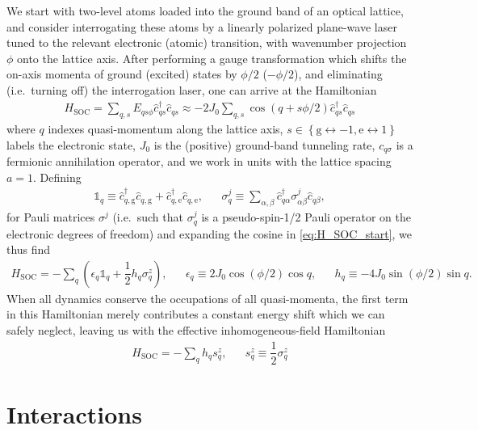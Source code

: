 \documentclass[aps,notitlepage,nofootinbib,11pt]{revtex4-1}
\renewcommand{\t}{\text} %
\newcommand{\f}[2]{\dfrac{#1}{#2}} %
\newcommand{\p}[1]{\left(#1\right)} %
\renewcommand{\set}[1]{\left\{#1\right\}} %
\newcommand{\g}{\text{g}} %
\newcommand{\e}{\text{e}}
\newcommand{\1}{\mathds{1}}
\begin{document}
We start with two-level atoms loaded into the ground band of an
optical lattice, and consider interrogating these atoms by a linearly
polarized plane-wave laser tuned to the relevant electronic (atomic)
transition, with wavenumber projection $\phi$ onto the lattice axis.
After performing a gauge transformation which shifts the on-axis
momenta of ground (excited) states by $\phi/2$ ($-\phi/2$), and
eliminating (i.e.~turning off) the interrogation laser, one can arrive
at the Hamiltonian
\begin{align}
  H_{\t{SOC}}
  = \sum_{q,s} E_{qs\phi} \hat c_{qs}^\dag \hat c_{qs}
  \approx -2 J_0\sum_{q,s} \cos\p{q+s\phi/2}
  \hat c_{qs}^\dag \hat c_{qs}
  \label{eq:H_SOC_start}
\end{align}
where $q$ indexes quasi-momentum along the lattice axis,
$s\in\set{\g\leftrightarrow-1,\e\leftrightarrow1}$ labels the
electronic state, $J_0$ is the (positive) ground-band tunneling rate,
$c_{q\sigma}$ is a fermionic annihilation operator, and we work in
units with the lattice spacing $a=1$.  Defining
\begin{align}
  \1_q \equiv \hat c_{q,\g}^\dag \hat c_{q,\g}
  + \hat c_{q,\e}^\dag \hat c_{q,\e},
  &&
  \sigma_q^j \equiv \sum_{\alpha,\beta}
  \hat c_{q\alpha}^\dag \sigma^j_{\alpha\beta} \hat c_{q\beta},
  \label{eq:pseudospin}
\end{align}
for Pauli matrices $\sigma^j$ (i.e.~such that $\sigma_q^j$ is a
pseudo-spin-1/2 Pauli operator on the electronic degrees of freedom)
and expanding the cosine in \eqref{eq:H_SOC_start}, we thus find
\begin{align}
  H_{\t{SOC}}
  = -\sum_q \p{\epsilon_q \1_q + \f12 h_q \sigma_q^z},
  &&
  \epsilon_q \equiv 2J_0 \cos\p{\phi/2} \cos q,
  &&
  h_q \equiv -4J_0 \sin\p{\phi/2} \sin q.
\end{align}
When all dynamics conserve the occupations of all quasi-momenta, the
first term in this Hamiltonian merely contributes a constant energy
shift which we can safely neglect, leaving us with the effective
inhomogeneous-field Hamiltonian
\begin{align}
  H_{\t{SOC}} = -\sum_q h_q s_q^z,
  &&
  s_q^z \equiv \f12 \sigma_q^z
  \label{eq:H_SOC}
\end{align}


\section{Interactions}
\end{document}
